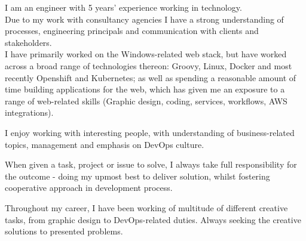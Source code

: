 \documentclass[9pt]{style/developercv}
\begin{document}
\begin{minipage}[t]{1\textwidth} %
	\vspace{-\baselineskip} %
	
	I am an engineer with 5 years’ experience working in technology.\\
	
	Due to my work with consultancy agencies I have a strong understanding of processes, engineering principals and communication with clients and stakeholders.\\

	I have primarily worked on the Windows-related web stack, but have worked across a broad range of technologies thereon: Groovy, Linux, Docker and most recently Openshift and Kubernetes; as well as spending a reasonable amount of time building applications for the web, which has given me an exposure to a range of web-related skills (Graphic design, coding, services, workflows, AWS integrations). \\

\end{minipage}

\vspace{1cm}


\begin{minipage}[t]{0.3\textwidth}
	\vspace{-\baselineskip}


	I enjoy working with interesting people, with understanding of business-related topics, management and emphasis 
	on DevOps culture.
\end{minipage}
\hfill
\begin{minipage}[t]{0.3\textwidth}
	\vspace{-\baselineskip}
	
	
	When given a task, project or issue to solve, I always take full responsibility for the outcome - doing my upmost
	best to deliver solution, whilst fostering cooperative approach in development process.
\end{minipage}
\hfill
\begin{minipage}[t]{0.3\textwidth}
	\vspace{-\baselineskip}
	
	
	Throughout my career, I have been working of multitude of different creative tasks, from graphic design to DevOps-related duties.
	Always seeking the creative solutions to presented problems. 
\end{minipage}
\end{document}
